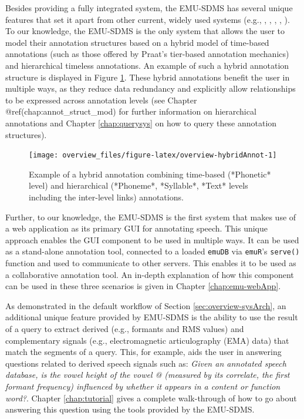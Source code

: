 \documentclass[]{book}
\begin{document}
Besides providing a fully integrated system, the EMU-SDMS has several unique features that set it apart from other current, widely used systems (e.g., \citet{boersma:2011a}, \citet{wittenburg:2006a}, \citet{fromont:2012a}, \citet{rose:2006a}, \citet{mcauliffe:2016a}). To our knowledge, the EMU-SDMS is the only system that allows the user to model their annotation structures based on a hybrid model of time-based annotations (such as those offered by Praat's tier-based annotation mechanics) and hierarchical timeless annotations. An example of such a hybrid annotation structure is displayed in Figure \ref{fig:overview-hybridAnnot}. These hybrid annotations benefit the user in multiple ways, as they reduce data redundancy and explicitly allow relationships to be expressed across annotation levels (see Chapter @ref(chap:annot\_struct\_mod) for further information on hierarchical annotations and Chapter \ref{chap:querysys} on how to query these annotation structures).

\begin{figure}

{\centering \texttt{[image: overview\_files/figure-latex/overview-hybridAnnot-1]} 

}

\caption{Example of a hybrid annotation combining time-based (*Phonetic* level) and hierarchical (*Phoneme*, *Syllable*, *Text* levels including the inter-level links) annotations.}\label{fig:overview-hybridAnnot}
\end{figure}

Further, to our knowledge, the EMU-SDMS is the first system that makes use of a web application as its primary GUI for annotating speech. This unique approach enables the GUI component to be used in multiple ways. It can be used as a stand-alone annotation tool, connected to a loaded \texttt{emuDB} via \texttt{emuR}'s \texttt{serve()} function and used to communicate to other servers. This enables it to be used as a collaborative annotation tool. An in-depth explanation of how this component can be used in these three scenarios is given in Chapter \ref{chap:emu-webApp}.

As demonstrated in the default workflow of Section \ref{sec:overview-sysArch}, an additional unique feature provided by EMU-SDMS is the ability to use the result of a query to extract derived (e.g., formants and RMS values) and complementary signals (e.g., electromagnetic articulography (EMA) data) that match the segments of a query. This, for example, aids the user in answering questions related to derived speech signals such as: \emph{Given an annotated speech database, is the vowel height of the vowel @ (measured by its correlate, the first formant frequency) influenced by whether it appears in a content or function word?}. Chapter \ref{chap:tutorial} gives a complete walk-through of how to go about answering this question using the tools provided by the EMU-SDMS.
\end{document}
